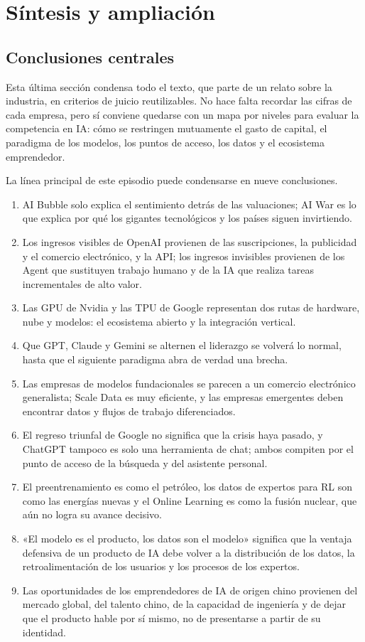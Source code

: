 \documentclass[a4paper]{article}
\begin{document}
\section{Síntesis y ampliación}

\subsection{Conclusiones centrales}

Esta última sección condensa todo el texto, que parte de un relato sobre la industria, en criterios de juicio reutilizables. No hace falta recordar las cifras de cada empresa, pero sí conviene quedarse con un mapa por niveles para evaluar la competencia en IA: cómo se restringen mutuamente el gasto de capital, el paradigma de los modelos, los puntos de acceso, los datos y el ecosistema emprendedor.

La línea principal de este episodio puede condensarse en nueve conclusiones.

\begin{enumerate}
\item AI Bubble solo explica el sentimiento detrás de las valuaciones; AI War es lo que explica por qué los gigantes tecnológicos y los países siguen invirtiendo.
\item Los ingresos visibles de OpenAI provienen de las suscripciones, la publicidad y el comercio electrónico, y la API; los ingresos invisibles provienen de los Agent que sustituyen trabajo humano y de la IA que realiza tareas incrementales de alto valor.
\item Las GPU de Nvidia y las TPU de Google representan dos rutas de hardware, nube y modelos: el ecosistema abierto y la integración vertical.
\item Que GPT, Claude y Gemini se alternen el liderazgo se volverá lo normal, hasta que el siguiente paradigma abra de verdad una brecha.
\item Las empresas de modelos fundacionales se parecen a un comercio electrónico generalista; Scale Data es muy eficiente, y las empresas emergentes deben encontrar datos y flujos de trabajo diferenciados.
\item El regreso triunfal de Google no significa que la crisis haya pasado, y ChatGPT tampoco es solo una herramienta de chat; ambos compiten por el punto de acceso de la búsqueda y del asistente personal.
\item El preentrenamiento es como el petróleo, los datos de expertos para RL son como las energías nuevas y el Online Learning es como la fusión nuclear, que aún no logra su avance decisivo.
\item «El modelo es el producto, los datos son el modelo» significa que la ventaja defensiva de un producto de IA debe volver a la distribución de los datos, la retroalimentación de los usuarios y los procesos de los expertos.
\item Las oportunidades de los emprendedores de IA de origen chino provienen del mercado global, del talento chino, de la capacidad de ingeniería y de dejar que el producto hable por sí mismo, no de presentarse a partir de su identidad.
\end{enumerate}
\end{document}
